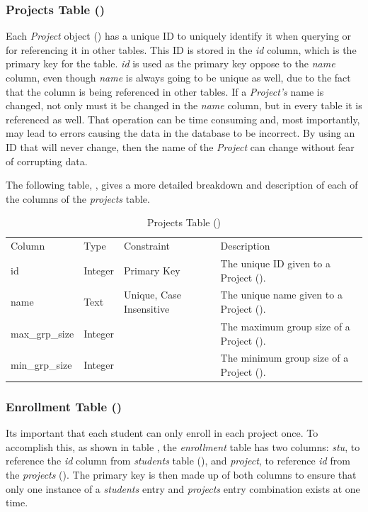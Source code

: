 \documentclass[12pt,letterpaper]{article}
\begin{document}
\subsubsection*{Projects Table ()}
Each \textit{Project} object () has a unique ID to uniquely identify it when querying or for referencing it in other tables. This ID is stored in the \textit{id} column, which is the primary key for the table. \textit{id} is used as the primary key oppose to the \textit{name} column, even though \textit{name} is always going to be unique as well, due to the fact that the column is being referenced in other tables. If a \textit{Project's} name is changed, not only must it be changed in the \textit{name} column, but in every table it is referenced as well. That operation can be time consuming and, most importantly, may lead to errors causing the data in the database to be incorrect. By using an ID that will never change, then the name of the \textit{Project} can change without fear of corrupting data.

The following table, , gives a more detailed breakdown and description of each of the columns of the \textit{projects} table.

\begin{table}[H]
	\caption{Projects Table ()} 
	\begin{tabu} to \textwidth {l l X X[3]}
		\tableheader{}Column & Type & Constraint & Description \\
		id             & Integer & Primary Key      & The unique ID given to a Project (). \\
		name           & Text    & Unique,\newline 
		                           Case Insensitive & The unique name given to a Project (). \\
		max\_grp\_size & Integer &                  & The maximum group size of a Project (). \\
		min\_grp\_size & Integer &                  & The minimum group size of a Project (). \\
	\end{tabu}
\end{table}

\subsubsection*{Enrollment Table ()}
Its important that each student can only enroll in each project once. To accomplish this, as shown in table , the \textit{enrollment} table has two columns: \textit{stu}, to reference the \textit{id} column from \textit{students} table (), and \textit{project}, to reference \textit{id} from the \textit{projects} (). The primary key is then made up of both columns to ensure that only one instance of a \textit{students} entry and \textit{projects} entry combination exists at one time.
\end{document}
